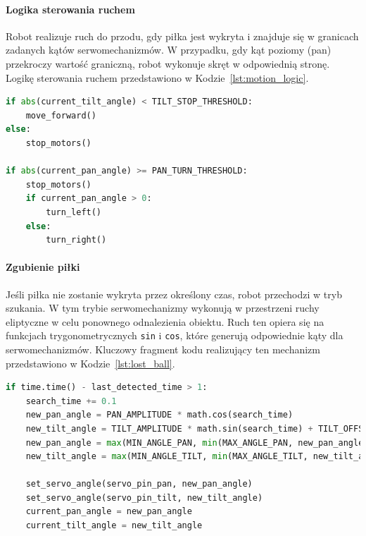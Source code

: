 \documentclass[a4paper,twoside,12pt]{book}
\begin{document}
\paragraph{Logika sterowania ruchem}
Robot realizuje ruch do przodu, gdy piłka jest wykryta i znajduje się w granicach zadanych kątów serwomechanizmów. W przypadku, gdy kąt poziomy (pan) przekroczy wartość graniczną, robot wykonuje skręt w odpowiednią stronę. Logikę sterowania ruchem przedstawiono w Kodzie~\ref{lst:motion_logic}.

\begin{lstlisting}[language=Python, caption={Logika sterowania ruchem robota.}, label={lst:motion_logic}, captionpos=b]
if abs(current_tilt_angle) < TILT_STOP_THRESHOLD:
    move_forward()
else:
    stop_motors()

if abs(current_pan_angle) >= PAN_TURN_THRESHOLD:
    stop_motors()
    if current_pan_angle > 0:
        turn_left()
    else:
        turn_right()
\end{lstlisting}

\paragraph{Zgubienie piłki}
Jeśli piłka nie zostanie wykryta przez określony czas, robot przechodzi w tryb szukania. W tym trybie serwomechanizmy wykonują w przestrzeni ruchy eliptyczne w celu ponownego odnalezienia obiektu. Ruch ten opiera się na funkcjach trygonometrycznych \texttt{sin} i \texttt{cos}, które generują odpowiednie kąty dla serwomechanizmów. Kluczowy fragment kodu realizujący ten mechanizm przedstawiono w Kodzie~\ref{lst:lost_ball}.

\begin{lstlisting}[language=Python, caption={Logika zgubienia piłki i ruchu eliptycznego.}, label={lst:lost_ball}, captionpos=b]
if time.time() - last_detected_time > 1:
    search_time += 0.1
    new_pan_angle = PAN_AMPLITUDE * math.cos(search_time)
    new_tilt_angle = TILT_AMPLITUDE * math.sin(search_time) + TILT_OFFSET
    new_pan_angle = max(MIN_ANGLE_PAN, min(MAX_ANGLE_PAN, new_pan_angle))
    new_tilt_angle = max(MIN_ANGLE_TILT, min(MAX_ANGLE_TILT, new_tilt_angle))

    set_servo_angle(servo_pin_pan, new_pan_angle)
    set_servo_angle(servo_pin_tilt, new_tilt_angle)
    current_pan_angle = new_pan_angle
    current_tilt_angle = new_tilt_angle
\end{lstlisting}
\end{document}
